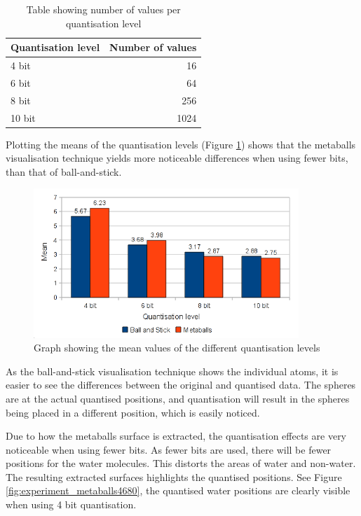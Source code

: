\begin{table}
  \begin{tabular}{ | l | r | }
  \hline
  Quantisation level & Number of values  \\ \hline
  4 bit              &               16  \\ \hline
  6 bit              &               64  \\ \hline
  8 bit              &              256  \\ \hline
  10 bit             &             1024  \\ \hline
  \end{tabular}
  \caption{Table showing number of values per quantisation level}
  \label{tab:results_bitvalues}
\end{table}

Plotting the means of the quantisation levels (Figure
\ref{fig:results_bm_means}) shows that the metaballs visualisation technique
yields more noticeable differences when using fewer bits, than that of
ball-and-stick.

\begin{figure}
  \begin{center}
    \includegraphics[width=100mm]{bm_means}
  \end{center}
  \caption{Graph showing the mean values of the different quantisation levels}
  \label{fig:results_bm_means}
\end{figure}

As the ball-and-stick visualisation technique shows the individual atoms, it is
easier to see the differences between the original and quantised data. The
spheres are at the actual quantised positions, and quantisation will result in
the spheres being placed in a different position, which is easily noticed.

Due to how the metaballs surface is extracted, the quantisation effects are
very noticeable when using fewer bits. As fewer bits are used, there will be
fewer positions for the water molecules. This distorts the areas of water and
non-water. The resulting extracted surfaces highlights the quantised positions.
See Figure \ref{fig:experiment_metaballs4680}, the quantised water positions
are clearly visible when using 4 bit quantisation.

